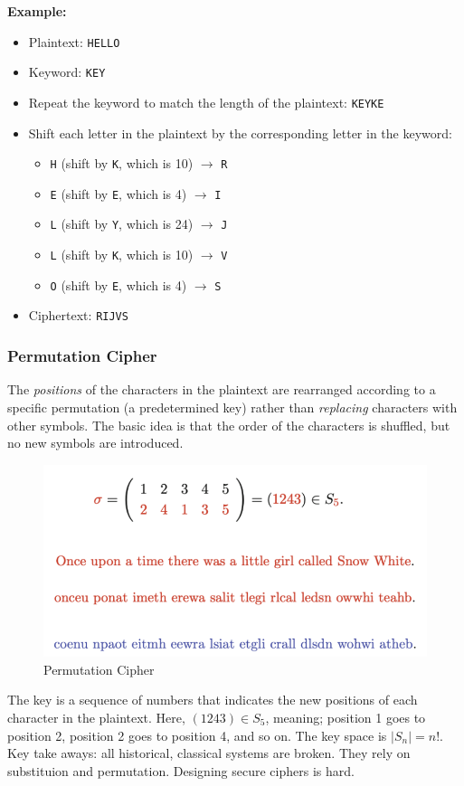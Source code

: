 \textbf{Example:} \begin{itemize}
    \item Plaintext: \texttt{HELLO}
    
    \item Keyword: \texttt{KEY}
    
    \item Repeat the keyword to match the length of the plaintext: \texttt{KEYKE}
    
    \item Shift each letter in the plaintext by the corresponding letter in the keyword:
    \begin{itemize}
        \item \texttt{H} (shift by \texttt{K}, which is 10) $\rightarrow$ \texttt{R}
        \item \texttt{E} (shift by \texttt{E}, which is 4) $\rightarrow$ \texttt{I}
        \item \texttt{L} (shift by \texttt{Y}, which is 24) $\rightarrow$ \texttt{J}
        \item \texttt{L} (shift by \texttt{K}, which is 10) $\rightarrow$ \texttt{V}
        \item \texttt{O} (shift by \texttt{E}, which is 4) $\rightarrow$ \texttt{S}
    \end{itemize}
    
    \item Ciphertext: \texttt{RIJVS}
\end{itemize}

\subsubsection{Permutation Cipher}
The \emph{positions} of the characters in the plaintext are rearranged according to a specific permutation (a predetermined key) rather than \emph{replacing} characters with other symbols. The basic idea is that the order of the characters is shuffled, but no new symbols are introduced. \\

\begin{figure}[h!]
    \centering
    \includegraphics[width=0.5\linewidth]{img/permcipher.png}
    \caption{Permutation Cipher}
\end{figure}

The key is a sequence of numbers that indicates the new positions of each character in the plaintext. Here, $(1243) \in S_5$, meaning; position 1 goes to position 2, position 2 goes to position 4, and so on. The key space is $|S_n| = n!$. \\

Key take aways: all historical, classical systems are broken. They rely on substituion and permutation. Designing secure ciphers is hard. 